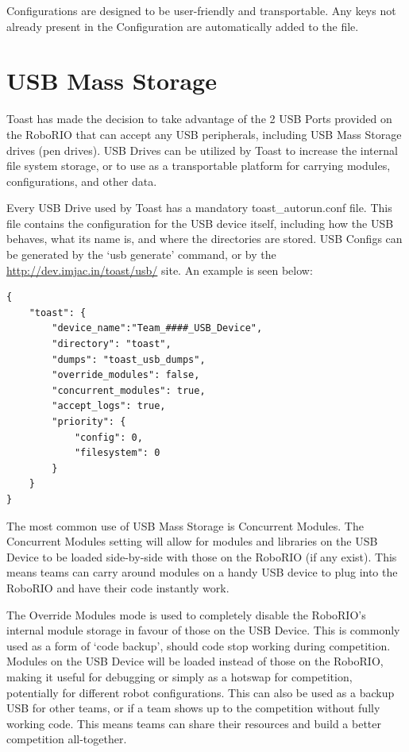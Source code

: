 \documentclass[a4paper,12pt]{article}
\begin{document}
Configurations are designed to be user-friendly and transportable. Any keys not already present in the Configuration are automatically added to the file.

\newpage

\section{USB Mass Storage}
Toast has made the decision to take advantage of the 2 USB Ports provided on the RoboRIO that can accept any USB peripherals, including USB Mass Storage drives (pen drives). USB Drives can be utilized by Toast to increase the internal file system storage, or to use as a transportable platform for carrying modules, configurations, and other data.

Every USB Drive used by Toast has a mandatory toast\_autorun.conf file. This file contains the configuration for the USB device itself, including how the USB behaves, what its name is, and where the directories are stored. USB Configs can be generated by the `usb generate' command, or by the \url{http://dev.imjac.in/toast/usb/} site. An example is seen below:

\begin{lstlisting}
{
    "toast": {
        "device_name":"Team_####_USB_Device",
        "directory": "toast",
        "dumps": "toast_usb_dumps",
        "override_modules": false,
        "concurrent_modules": true,
        "accept_logs": true,
        "priority": {
            "config": 0,
            "filesystem": 0
        }
    }
}
\end{lstlisting}

The most common use of USB Mass Storage is Concurrent Modules. The Concurrent Modules setting will allow for modules and libraries on the USB Device to be loaded side-by-side with those on the RoboRIO (if any exist). This means teams can carry around modules on a handy USB device to plug into the RoboRIO and have their code instantly work. 

The Override Modules mode is used to completely disable the RoboRIO's internal module storage in favour of those on the USB Device. This is commonly used as a form of `code backup', should code stop working during competition. Modules on the USB Device will be loaded instead of those on the RoboRIO, making it useful for debugging or simply as a hotswap for competition, potentially for different robot configurations. This can also be used as a backup USB for other teams, or if a team shows up to the competition without fully working code. This means teams can share their resources and build a better competition all-together.
\end{document}
